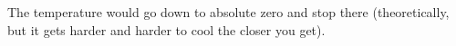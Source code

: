 The temperature would go down to absolute zero and stop there (theoretically, but it gets harder and harder to cool the closer you get).